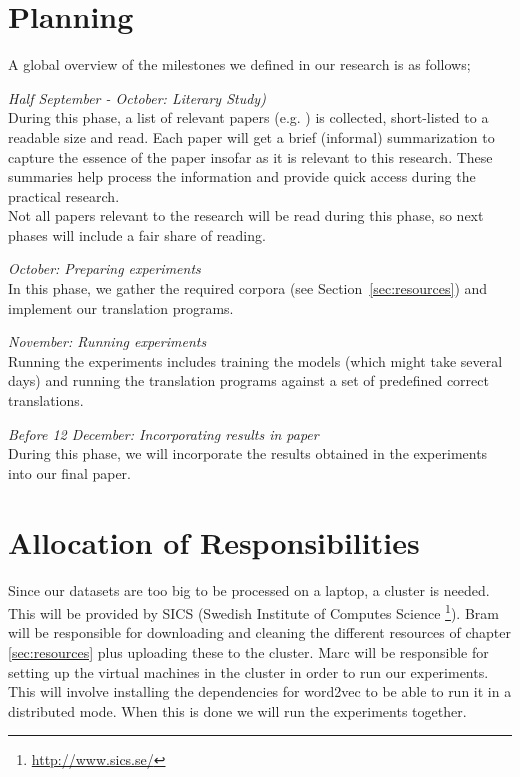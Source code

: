 \section{Planning}
A global overview of the milestones we defined in our research is as follows;
\begin{description}
  \item \emph{Half September - October: Literary Study)}\\
    During this phase, a list of relevant papers (e.g. \cite{levy2014linguistic, mikolov2013exploiting, wolf2014joint}) is collected, short-listed to a readable size and read. Each paper will get a brief (informal) summarization to capture the essence of the paper insofar as it is relevant to this research. These summaries help process the information and provide quick access during the practical research.\\

    Not all papers relevant to the research will be read during this phase, so next phases will include a fair share of reading.
  \item \emph{October: Preparing experiments}\\
    In this phase, we gather the required corpora (see Section~\ref{sec:resources}) and implement our translation programs.
  \item \emph{November: Running experiments}\\
    Running the experiments includes training the models (which might take several days) and running the translation programs against a set of predefined correct translations.
  \item \emph{Before 12 December: Incorporating results in paper}\\
    During this phase, we will incorporate the results obtained in the experiments into our final paper.
\end{description}

\section{Allocation of Responsibilities}
Since our datasets are too big to be processed on a laptop, a cluster is needed. This will be provided by SICS (Swedish Institute of Computes Science \footnote{\url{http://www.sics.se/}}). Bram will be responsible for downloading and cleaning the different resources of chapter \ref{sec:resources} plus uploading these to the cluster. Marc will be responsible for setting up the virtual machines in the cluster in order to run our experiments. This will involve installing the dependencies for word2vec to be able to run it in a distributed mode. When this is done we will run the experiments together.

